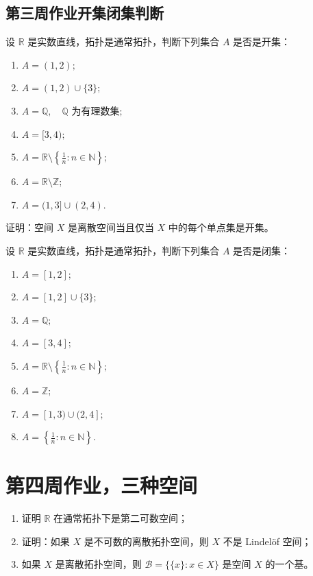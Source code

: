 \subsection*{第三周作业开集闭集判断}

\begin{exercise}
设 $\mathbb{R}$ 是实数直线，拓扑是通常拓扑，判断下列集合 $A$ 是否是开集：  
\begin{enumerate}
  \item $A = (1,2);$
  \item $A = (1,2) \cup \{3\};$
  \item $A = \mathbb{Q}, \quad \mathbb{Q} \text{ 为有理数集};$
  \item $A = [3,4);$
  \item $A = \mathbb{R}\setminus\left\{\tfrac{1}{n} : n\in\mathbb{N}\right\};$
  \item $A = \mathbb{R}\setminus\mathbb{Z};$
  \item $A = (1,3]\cup(2,4).$
\end{enumerate}
\end{exercise}

\begin{exercise}
证明：空间 $X$ 是离散空间当且仅当 $X$ 中的每个单点集是开集。
\end{exercise}

\begin{exercise}
设 $\mathbb{R}$ 是实数直线，拓扑是通常拓扑，判断下列集合 $A$ 是否是闭集：  
\begin{enumerate}
  \item $A = [1,2];$
  \item $A = [1,2]\cup\{3\};$
  \item $A = \mathbb{Q};$
  \item $A = [3,4];$
  \item $A = \mathbb{R}\setminus\left\{\tfrac{1}{n}:n\in\mathbb{N}\right\};$
  \item $A = \mathbb{Z};$
  \item $A = [1,3)\cup(2,4];$
  \item $A = \left\{\tfrac{1}{n}:n\in\mathbb{N}\right\}.$
\end{enumerate}
\end{exercise}

\section*{第四周作业，三种空间}

\begin{homework}
[4]
\begin{enumerate}
  \item 证明 $\mathbb{R}$ 在通常拓扑下是第二可数空间；
  \item 证明：如果 $X$ 是不可数的离散拓扑空间，则 $X$ 不是 Lindelöf 空间；
  \item 如果 $X$ 是离散拓扑空间，则 $\mathcal{B} = \{\{x\}: x \in X\}$ 是空间 $X$ 的一个基。
\end{enumerate}
\end{homework}

